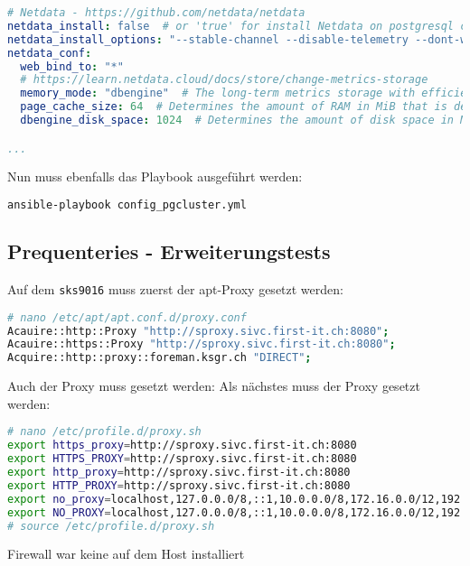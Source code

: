 \begin{flushleft}
\begin{lstlisting}[language=yaml, caption=Testsystem - Anhang - Maintenance - main.yml,captionpos=b,label={lst:testsystem-maintenance-main.yml},breaklines=true]
# Netdata - https://github.com/netdata/netdata
netdata_install: false  # or 'true' for install Netdata on postgresql cluster nodes (with kickstart.sh)
netdata_install_options: "--stable-channel --disable-telemetry --dont-wait"
netdata_conf:
  web_bind_to: "*"
  # https://learn.netdata.cloud/docs/store/change-metrics-storage
  memory_mode: "dbengine"  # The long-term metrics storage with efficient RAM and disk usage.
  page_cache_size: 64  # Determines the amount of RAM in MiB that is dedicated to caching Netdata metric values.
  dbengine_disk_space: 1024  # Determines the amount of disk space in MiB that is dedicated to storing Netdata metric values.

...

    \end{lstlisting}
    Nun muss ebenfalls das Playbook ausgeführt werden:
    \lstset{style=gra_codestyle}
    \begin{lstlisting}[language=bash, caption=Testsystem - Anhang - Maintenance - config\_pgcluster.yml,captionpos=b,label={lst:config-appendix-pgcluster},breaklines=true]
ansible-playbook config_pgcluster.yml
    \end{lstlisting}
    \subsection{Prequenteries - Erweiterungstests}
    Auf dem \texttt{sks9016} muss zuerst der apt-Proxy gesetzt werden:
    \lstset{style=gra_codestyle}
    \begin{lstlisting}[language=bash, caption=Testsystem - sks9016 - apt-Proxy Settings,captionpos=b,label={lst:testsystem-installation-sks9016-apt-proxy-settings},breaklines=true]
# nano /etc/apt/apt.conf.d/proxy.conf
Acauire::http::Proxy "http://sproxy.sivc.first-it.ch:8080";
Acauire::https::Proxy "http://sproxy.sivc.first-it.ch:8080";
Acquire::http::proxy::foreman.ksgr.ch "DIRECT";
    \end{lstlisting}
    Auch der Proxy muss gesetzt werden:
    Als nächstes muss der Proxy gesetzt werden:
    \lstset{style=gra_codestyle}
    \begin{lstlisting}[language=bash, caption=Testsystem - sks9016 - Proxy Settings,captionpos=b,label={lst:testsystem-installation-sks9016-proxy-settings},breaklines=true]
# nano /etc/profile.d/proxy.sh
export https_proxy=http://sproxy.sivc.first-it.ch:8080
export HTTPS_PROXY=http://sproxy.sivc.first-it.ch:8080
export http_proxy=http://sproxy.sivc.first-it.ch:8080
export HTTP_PROXY=http://sproxy.sivc.first-it.ch:8080
export no_proxy=localhost,127.0.0.0/8,::1,10.0.0.0/8,172.16.0.0/12,192.168.0.0/16
export NO_PROXY=localhost,127.0.0.0/8,::1,10.0.0.0/8,172.16.0.0/12,192.168.0.0/16
# source /etc/profile.d/proxy.sh
    \end{lstlisting}
    Firewall war keine auf dem Host installiert

\end{flushleft}
